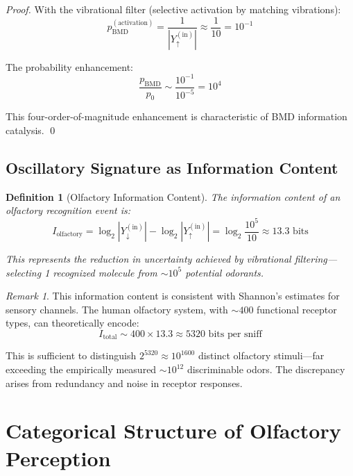 \documentclass[11pt]{article}
\newtheorem{definition}[theorem]{Definition}
\theoremstyle{remark}
\newtheorem{remark}[theorem]{Remark}
\begin{document}
\begin{proof}
With the vibrational filter (selective activation by matching vibrations):
\begin{equation}
p_{\text{BMD}}^{(\text{activation})} = \frac{1}{|Y_{\uparrow}^{(\text{in})}|} \approx \frac{1}{10} = 10^{-1}
\end{equation}

The probability enhancement:
\begin{equation}
\frac{p_{\text{BMD}}}{p_0} \sim \frac{10^{-1}}{10^{-5}} = 10^4
\end{equation}

This four-order-of-magnitude enhancement is characteristic of BMD information catalysis. \qed
\end{proof}

\subsection{Oscillatory Signature as Information Content}

\begin{definition}[Olfactory Information Content]
\label{def:olfactory_information}
The information content of an olfactory recognition event is:
\begin{equation}
I_{\text{olfactory}} = \log_2 |Y_{\downarrow}^{(\text{in})}| - \log_2 |Y_{\uparrow}^{(\text{in})}| = \log_2 \frac{10^5}{10} \approx 13.3 \text{ bits}
\end{equation}

This represents the reduction in uncertainty achieved by vibrational filtering—selecting 1 recognized molecule from $\sim 10^5$ potential odorants.
\end{definition}

\begin{remark}
This information content is consistent with Shannon's estimates for sensory channels. The human olfactory system, with $\sim 400$ functional receptor types, can theoretically encode:
\begin{equation}
I_{\text{total}} \sim 400 \times 13.3 \approx 5320 \text{ bits per sniff}
\end{equation}

This is sufficient to distinguish $2^{5320} \approx 10^{1600}$ distinct olfactory stimuli—far exceeding the empirically measured $\sim 10^{12}$ discriminable odors. The discrepancy arises from redundancy and noise in receptor responses.
\end{remark}

\section{Categorical Structure of Olfactory Perception}
\end{document}
